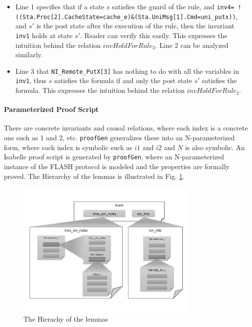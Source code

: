 \documentclass{llncs-new}
\begin{document}
\begin{itemize}[noitemsep,nolistsep]
\item Line 1 specifies that if a state $s$ satisfies the guard of the rule, and %
  {\tt inv4= !((Sta.Proc[2].CacheState=cache\_e)\&(Sta.UniMsg[1].Cmd=uni\_putx))}, and $s'$ is the post state after the execution of the rule, then the invariant {\tt inv1} holds at state $s'$. Reader can verify this easily. This expresses the intuition behind the  relation $invHoldForRule_3$. Line 2 can be analyzed similarly.
 \item Line 3 that {\tt NI\_Remote\_PutX[3]} has nothing to do with all the variables in {\tt inv1}, thus $s$ satisfies the formula if and only the post state   $s'$ satisfies the formula. This expresses the intuition behind the   relation $invHoldForRule_2$.
\end{itemize}%

\vspace{-5pt}
\paragraph{Parameterized Proof Script} There are concrete invariants and causal relations, where each  index is a concrete one such as 1 and 2, etc. {\tt proofGen} generalizes these into an N-parameterized form, where each index is symbolic such as $i1$ and $i2$ and $N$ is also symbolic. An Isabelle proof script is  generated by {\tt proofGen}, where an N-parameterized instance of the FLASH protocol is modeled   and the properties are formally proved. The Hierarchy of the lemmas is illustrated in Fig. \ref{fig:lemmaHierachy}. %


\vspace{-20pt}

\begin{figure}[htbp]
\centering %


\includegraphics[width=0.8\textwidth]{thy.pdf}
\vspace{-20pt}
\caption{The Hierachy of the lemmas\label{fig:lemmaHierachy}
}
\end{figure}
\end{document}
